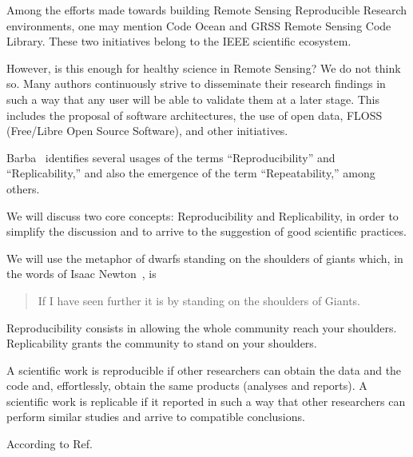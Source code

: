 \documentclass[journal,twopage]{IEEEtran}
\begin{document}
Among the efforts made towards building Remote Sensing Reproducible Research environments, one may mention Code Ocean and GRSS Remote Sensing Code Library. 
These two initiatives belong to the IEEE scientific ecosystem. 
	
However, is this enough for healthy science in Remote Sensing? 
We do not think so. 
Many authors continuously strive to disseminate their research findings in such a way that any user will be able to validate them at a later stage. 
This includes the proposal of software architectures, the use of open data, FLOSS (Free/Libre Open Source Software), and other initiatives.

Barba~\cite{TerminologiesforReproducibleResearch} identifies several usages of the terms ``Reproducibility'' and ``Replicability,'' and also the emergence of the term ``Repeatability,'' among others.

We will discuss two core concepts: Reproducibility and Replicability, in order to simplify the discussion and to arrive to the suggestion of good scientific practices.

We will use the metaphor of dwarfs standing on the shoulders of giants which, in the words of Isaac Newton~\cite{LetterNewton}, is
\begin{quote}
If I have seen further it is by standing on the shoulders of Giants.
\end{quote}
Reproducibility consists in allowing the whole community reach your shoulders.
Replicability grants the community to stand on your shoulders.

A scientific work is reproducible if other researchers can obtain the data and the code and, effortlessly, obtain the same products (analyses and reports).
A scientific work is replicable if it reported in such a way that other researchers can perform similar studies and arrive to compatible conclusions.


According to Ref.~\cite{ReproducibilityandReplicabilityinScience2019}
		
\end{document}
